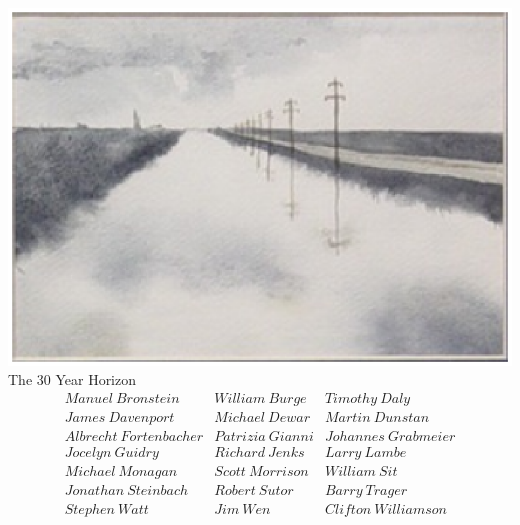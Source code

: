\usepackage{hyperref}
\usepackage{amssymb}
\usepackage{axiom}
\usepackage{makeidx}
\setlength{\textwidth}{400pt}
\makeindex
\usepackage{graphicx}
\usepackage{changepage} %


\frontmatter
\setcounter{secnumdepth}{1}
\begin{titlepage}
\vskip 0.1in
\includegraphics{ps/bluebayou.ps}\\
\vskip 0.1in
{\Huge{The 30 Year Horizon}}
\vskip 0.1in
$$
\begin{array}{lll}
Manuel\ Bronstein      & William\ Burge   & Timothy\ Daly \\
James\ Davenport       & Michael\ Dewar   & Martin\ Dunstan \\
Albrecht\ Fortenbacher & Patrizia\ Gianni & Johannes\ Grabmeier \\
Jocelyn\ Guidry        & Richard\ Jenks   & Larry\ Lambe \\
Michael\ Monagan       & Scott\ Morrison  & William\ Sit \\
Jonathan\ Steinbach    & Robert\ Sutor    & Barry\ Trager \\
Stephen\ Watt          & Jim\ Wen         & Clifton\ Williamson
\end{array}
$$
\center{\large{\VolumeName}}
\end{titlepage}
